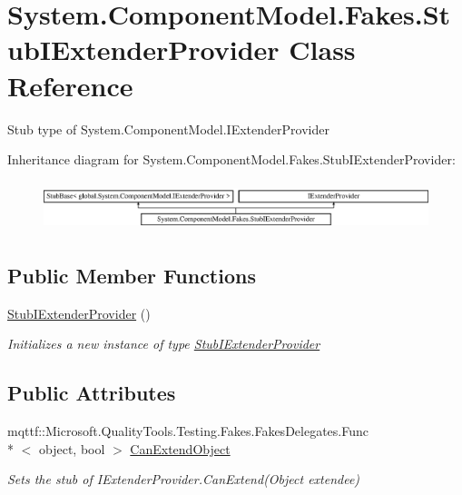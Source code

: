 \hypertarget{class_system_1_1_component_model_1_1_fakes_1_1_stub_i_extender_provider}{\section{System.\-Component\-Model.\-Fakes.\-Stub\-I\-Extender\-Provider Class Reference}
\label{class_system_1_1_component_model_1_1_fakes_1_1_stub_i_extender_provider}
}


Stub type of System.\-Component\-Model.\-I\-Extender\-Provider 


Inheritance diagram for System.\-Component\-Model.\-Fakes.\-Stub\-I\-Extender\-Provider\-:\begin{figure}[H]
\begin{center}
\leavevmode
\includegraphics[height=1.462141cm]{class_system_1_1_component_model_1_1_fakes_1_1_stub_i_extender_provider}
\end{center}
\end{figure}
\subsection*{Public Member Functions}
\begin{DoxyCompactItemize}
\item 
\hyperlink{class_system_1_1_component_model_1_1_fakes_1_1_stub_i_extender_provider_ab55fdc2aed459a121b1fc6b45e6cf290}{Stub\-I\-Extender\-Provider} ()
\begin{DoxyCompactList}\small\item\em Initializes a new instance of type \hyperlink{class_system_1_1_component_model_1_1_fakes_1_1_stub_i_extender_provider}{Stub\-I\-Extender\-Provider}\end{DoxyCompactList}\end{DoxyCompactItemize}
\subsection*{Public Attributes}
\begin{DoxyCompactItemize}
\item 
mqttf\-::\-Microsoft.\-Quality\-Tools.\-Testing.\-Fakes.\-Fakes\-Delegates.\-Func\\*
$<$ object, bool $>$ \hyperlink{class_system_1_1_component_model_1_1_fakes_1_1_stub_i_extender_provider_a7e1ecf76f62feef9f48e80c40466600f}{Can\-Extend\-Object}
\begin{DoxyCompactList}\small\item\em Sets the stub of I\-Extender\-Provider.\-Can\-Extend(\-Object extendee)\end{DoxyCompactList}\end{DoxyCompactItemize}


